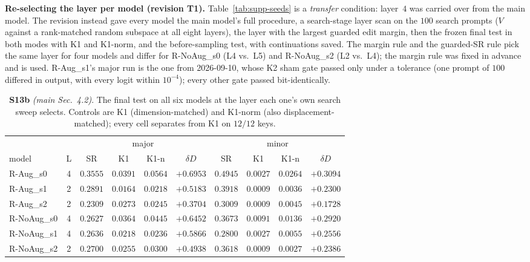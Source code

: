\documentclass{article}
\begin{document}
\textbf{Re-selecting the layer per model (revision T1).} Table~\ref{tab:supp-seeds} is a
\emph{transfer} condition: layer~$4$ was carried over from the main model. The revision
instead gave every model the main model's full procedure, a search-stage layer scan on
the $100$ search prompts ($V$ against a rank-matched random subspace at all eight
layers), the layer with the largest guarded edit margin, then the frozen final test in
both modes with K1 and K1-norm, and the before-sampling test, with continuations saved.
The margin rule and the guarded-SR rule pick the same layer for four models and differ
for R-NoAug\_s0 (L4 vs.\ L5) and R-NoAug\_s2 (L2 vs.\ L4); the margin rule was fixed in
advance and is used. R-Aug\_s1's major run is the one from 2026-09-10, whose K2 sham
gate passed only under a tolerance (one prompt of $100$ differed in output, with every
logit within $10^{-4}$); every other gate passed bit-identically.

\begin{table}[!t]
\centering
\caption{\textbf{S13b} \textit{(main Sec.~4.2)}. The final test on all six models at the
layer each one's own search sweep selects. Controls are K1 (dimension-matched) and K1-norm
(also displacement-matched); every cell separates from K1 on $12/12$ keys.}
\label{tab:supp-seeds-reselect}
\footnotesize
\setlength{\tabcolsep}{3.5pt}
\begin{tabular}{@{}lccccccccc@{}}
\toprule
 & & \multicolumn{4}{c}{major} & \multicolumn{4}{c}{minor}\\
model & L & SR & K1 & K1-n & $\delta D$ & SR & K1 & K1-n & $\delta D$\\
\midrule
R-Aug\_s0 & 4 & $0.3555$ & $0.0391$ & $0.0564$ & $+0.6953$ & $0.4945$ & $0.0027$ & $0.0264$ & $+0.3094$\\
R-Aug\_s1 & 2 & $0.2891$ & $0.0164$ & $0.0218$ & $+0.5183$ & $0.3918$ & $0.0009$ & $0.0036$ & $+0.2300$\\
R-Aug\_s2 & 2 & $0.2309$ & $0.0273$ & $0.0245$ & $+0.3704$ & $0.3009$ & $0.0009$ & $0.0045$ & $+0.1728$\\
R-NoAug\_s0 & 4 & $0.2627$ & $0.0364$ & $0.0445$ & $+0.6452$ & $0.3673$ & $0.0091$ & $0.0136$ & $+0.2920$\\
R-NoAug\_s1 & 4 & $0.2636$ & $0.0218$ & $0.0236$ & $+0.5866$ & $0.2800$ & $0.0027$ & $0.0055$ & $+0.2556$\\
R-NoAug\_s2 & 2 & $0.2700$ & $0.0255$ & $0.0300$ & $+0.4938$ & $0.3618$ & $0.0009$ & $0.0027$ & $+0.2386$\\
\bottomrule
\end{tabular}
\end{table}
\end{document}
